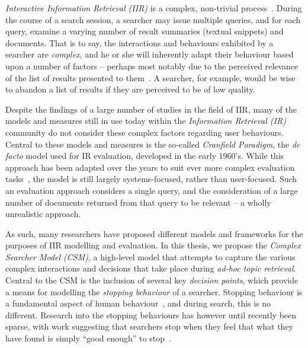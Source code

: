 
\begin{preamble}[Abstract]
{}

\emph{Interactive Information Retrieval (IIR)} is a complex, non-trivial process~\citep{ingwersen2005theturn}. During the course of a search session, a searcher may issue multiple queries, and for each query, examine a varying number of result summaries (textual snippets) and documents. That is to say, the interactions and behaviours exhibited by a searcher are \emph{complex}, and he or she will inherently adapt their behaviour based upon a number of factors -- perhaps most notably due to the perceived relevance of the list of results presented to them~\citep{moffat2013users_versus_models}. A searcher, for example, would be wise to abandon a list of results if they are perceived to be of low quality.

Despite the findings of a large number of studies in the field of IIR, many of the models and measures still in use today within the \emph{Information Retrieval (IR)} community do not consider these complex factors regarding user behaviours. Central to these models and measures is the so-called \emph{Cranfield Paradigm}, the \emph{de facto} model used for IR evaluation, developed in the early 1960's. While this approach has been adapted over the years to suit ever more complex evaluation tasks~\citep{harman2010cranfield}, the model is still largely systems-focused, rather than user-focused. Such an evaluation approach considers a single query, and the consideration of a large number of documents returned from that query to be relevant -- a wholly unrealistic approach.

As such, many researchers have proposed different models and frameworks for the purposes of IIR modelling and evaluation. In this thesis, we propose the \emph{Complex Searcher Model (CSM)}, a high-level model that attempts to capture the various complex interactions and decisions that take place during \emph{ad-hoc topic retrieval}. Central to the CSM is the inclusion of several key \emph{decision points}, which provide a means for modelling the \emph{stopping behaviour} of a searcher. Stopping behaviour is a fundamental aspect of human behaviour~\citep{nickles1995judgment}, and during search, this is no different. Research into the stopping behaviours has however until recently been sparse, with work suggesting that searchers stop when they feel that what they have found is simply ``good enough'' to stop~\citep{wu2014information_scent}.


\end{preamble}
